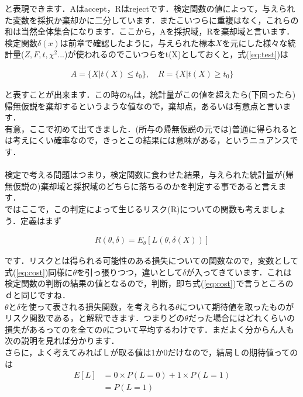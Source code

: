 \documentclass[11pt,a4paper]{ujreport} 	%
\begin{document}
と表現できます．Aはaccept，Rはrejectです．検定関数の値によって，与えられた変数を採択か棄却かに二分しています．またこいつらに重複はなく，これらの和は当然全体集合になります．ここから，Aを採択域，Rを棄却域と言います．\\

検定関数$\delta(x)$は前章で確認したように，与えられた標本$X$を元にした様々な統計量($Z,F,t,\chi^2...$)が使われるのでこいつらをt(X)としておくと，式(\ref{eq:test})は

\begin{align}
  A = \{X|t(X) \leq t_0\}, \quad R = \{X|t(X) \geq t_0\}
\end{align}

と表すことが出来ます．この時の$t_0$は，統計量がこの値を超えたら(下回ったら)帰無仮説を棄却するというような値なので，棄却点，あるいは有意点と言います．\\

有意，ここで初めて出てきました．(所与の帰無仮説の元では)普通に得られるとは考えにくい確率なので，きっとこの結果には意味がある，というニュアンスです．\\
\\

検定で考える問題はつまり，検定関数に食わせた結果，与えられた統計量が(帰無仮説の)棄却域と採択域のどちらに落ちるのかを判定する事であると言えます．\\

ではここで，この判定によって生じるリスク(R)についての関数も考えましょう．定義はまず

\begin{align}
  R(\theta, \delta) = E_\theta[L(\theta, \delta(X))]
\end{align}

です．リスクとは得られる可能性のある損失についての関数なので，変数として式(\ref{eq:cost})同様に$\theta$を引っ張りつつ，違いとして$\delta$が入ってきています．これは検定関数の判断の結果の値となるので，判断，即ち式(\ref{eq:cost})で言うところのｄと同じですね．\\

$\theta$と$\delta$を使って表される損失関数，を考えられる$\theta$について期待値を取ったものがリスク関数である，と解釈できます．つまりどの$\theta$だった場合にはどれくらいの損失があるってのを全ての$\theta$について平均するわけです．まだよく分からん人も次の説明を見れば分かります．\\

さらに，よく考えてみればＬが取る値は1か0だけなので，結局Ｌの期待値ってのは
\begin{align}
  E[L] &= 0 \times P(L=0) + 1 \times P(L=1)\\
       &= P(L=1)
\end{align}
\end{document}
